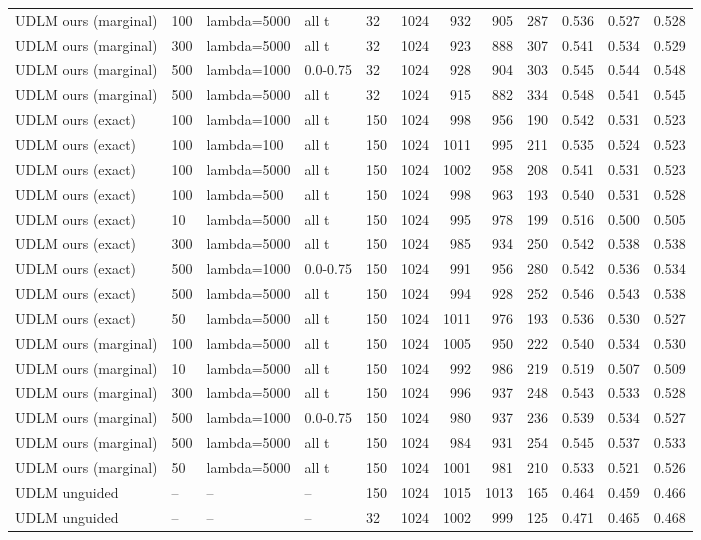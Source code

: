 \begin{tabular}{lllllrrrrrrr}
UDLM ours (marginal) & 100 & lambda=5000 & all t & 32 & 1024 & 932 & 905 & 287 & 0.536 & 0.527 & 0.528 \\
UDLM ours (marginal) & 300 & lambda=5000 & all t & 32 & 1024 & 923 & 888 & 307 & 0.541 & 0.534 & 0.529 \\
UDLM ours (marginal) & 500 & lambda=1000 & 0.0-0.75 & 32 & 1024 & 928 & 904 & 303 & 0.545 & 0.544 & 0.548 \\
UDLM ours (marginal) & 500 & lambda=5000 & all t & 32 & 1024 & 915 & 882 & 334 & 0.548 & 0.541 & 0.545 \\
UDLM ours (exact) & 100 & lambda=1000 & all t & 150 & 1024 & 998 & 956 & 190 & 0.542 & 0.531 & 0.523 \\
UDLM ours (exact) & 100 & lambda=100 & all t & 150 & 1024 & 1011 & 995 & 211 & 0.535 & 0.524 & 0.523 \\
UDLM ours (exact) & 100 & lambda=5000 & all t & 150 & 1024 & 1002 & 958 & 208 & 0.541 & 0.531 & 0.523 \\
UDLM ours (exact) & 100 & lambda=500 & all t & 150 & 1024 & 998 & 963 & 193 & 0.540 & 0.531 & 0.528 \\
UDLM ours (exact) & 10 & lambda=5000 & all t & 150 & 1024 & 995 & 978 & 199 & 0.516 & 0.500 & 0.505 \\
UDLM ours (exact) & 300 & lambda=5000 & all t & 150 & 1024 & 985 & 934 & 250 & 0.542 & 0.538 & 0.538 \\
UDLM ours (exact) & 500 & lambda=1000 & 0.0-0.75 & 150 & 1024 & 991 & 956 & 280 & 0.542 & 0.536 & 0.534 \\
UDLM ours (exact) & 500 & lambda=5000 & all t & 150 & 1024 & 994 & 928 & 252 & 0.546 & 0.543 & 0.538 \\
UDLM ours (exact) & 50 & lambda=5000 & all t & 150 & 1024 & 1011 & 976 & 193 & 0.536 & 0.530 & 0.527 \\
UDLM ours (marginal) & 100 & lambda=5000 & all t & 150 & 1024 & 1005 & 950 & 222 & 0.540 & 0.534 & 0.530 \\
UDLM ours (marginal) & 10 & lambda=5000 & all t & 150 & 1024 & 992 & 986 & 219 & 0.519 & 0.507 & 0.509 \\
UDLM ours (marginal) & 300 & lambda=5000 & all t & 150 & 1024 & 996 & 937 & 248 & 0.543 & 0.533 & 0.528 \\
UDLM ours (marginal) & 500 & lambda=1000 & 0.0-0.75 & 150 & 1024 & 980 & 937 & 236 & 0.539 & 0.534 & 0.527 \\
UDLM ours (marginal) & 500 & lambda=5000 & all t & 150 & 1024 & 984 & 931 & 254 & 0.545 & 0.537 & 0.533 \\
UDLM ours (marginal) & 50 & lambda=5000 & all t & 150 & 1024 & 1001 & 981 & 210 & 0.533 & 0.521 & 0.526 \\
UDLM unguided & -- & -- & -- & 150 & 1024 & 1015 & 1013 & 165 & 0.464 & 0.459 & 0.466 \\
UDLM unguided & -- & -- & -- & 32 & 1024 & 1002 & 999 & 125 & 0.471 & 0.465 & 0.468 \\
\bottomrule
\end{tabular}
